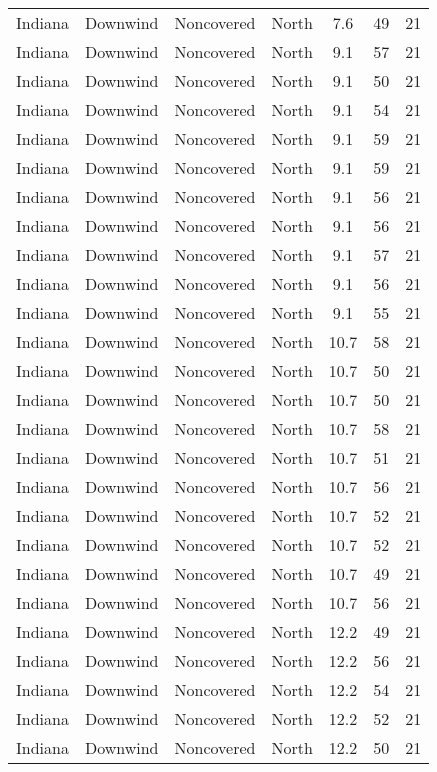 \documentclass{article}
\begin{document}
\begin{longtable}[H]{ccccccc}
Indiana & Downwind & Noncovered & North  & 7.6  & 49 & 21 \\
Indiana & Downwind & Noncovered & North  & 9.1  & 57 & 21 \\
Indiana & Downwind & Noncovered & North  & 9.1  & 50 & 21 \\
Indiana & Downwind & Noncovered & North  & 9.1  & 54 & 21 \\
Indiana & Downwind & Noncovered & North  & 9.1  & 59 & 21 \\
Indiana & Downwind & Noncovered & North  & 9.1  & 59 & 21 \\
Indiana & Downwind & Noncovered & North  & 9.1  & 56 & 21 \\
Indiana & Downwind & Noncovered & North  & 9.1  & 56 & 21 \\
Indiana & Downwind & Noncovered & North  & 9.1  & 57 & 21 \\
Indiana & Downwind & Noncovered & North  & 9.1  & 56 & 21 \\
Indiana & Downwind & Noncovered & North  & 9.1  & 55 & 21 \\
Indiana & Downwind & Noncovered & North  & 10.7 & 58 & 21 \\
Indiana & Downwind & Noncovered & North  & 10.7 & 50 & 21 \\
Indiana & Downwind & Noncovered & North  & 10.7 & 50 & 21 \\
Indiana & Downwind & Noncovered & North  & 10.7 & 58 & 21 \\
Indiana & Downwind & Noncovered & North  & 10.7 & 51 & 21 \\
Indiana & Downwind & Noncovered & North  & 10.7 & 56 & 21 \\
Indiana & Downwind & Noncovered & North  & 10.7 & 52 & 21 \\
Indiana & Downwind & Noncovered & North  & 10.7 & 52 & 21 \\
Indiana & Downwind & Noncovered & North  & 10.7 & 49 & 21 \\
Indiana & Downwind & Noncovered & North  & 10.7 & 56 & 21 \\
Indiana & Downwind & Noncovered & North  & 12.2 & 49 & 21 \\
Indiana & Downwind & Noncovered & North  & 12.2 & 56 & 21 \\
Indiana & Downwind & Noncovered & North  & 12.2 & 54 & 21 \\
Indiana & Downwind & Noncovered & North  & 12.2 & 52 & 21 \\
Indiana & Downwind & Noncovered & North  & 12.2 & 50 & 21 \\

\end{longtable}
\end{document}
